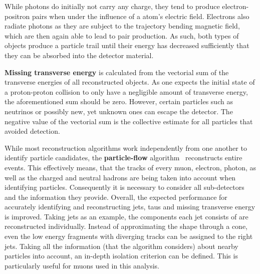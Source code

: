 While photons do initially not carry any charge, they tend to produce electron-positron pairs when under the influence of a atom's electric field. Electrons also radiate photons as they are subject to the trajectory bending magnetic field, which are then again able to lead to pair production. As such, both types of objects produce a particle trail until their energy has decreased sufficiently that they can be absorbed into the detector material.

\textbf{Missing transverse energy} is calculated from the vectorial sum of the transverse energies of all reconstructed objects. As one expects the initial state of a proton-proton collision to only have a negligible amount of transverse energy, the aforementioned sum should be zero. However, certain particles such as neutrinos or possibly new, yet unknown ones can escape the detector. The negative value of the vectorial sum is the collective estimate for all particles that avoided detection.

While most reconstruction algorithms work independently from one another to identify particle candidates, the \textbf{particle-flow} algorithm~\cite{pflow} reconstructs entire events. This effectively means, that the tracks of every muon, electron, photon, as well as the charged and neutral hadrons are being taken into account when identifying particles. Consequently it is necessary to consider all sub-detectors and the information they provide. Overall, the expected performance for accurately identifying and reconstructing jets, taus and missing transverse energy is improved. Taking jets as an example, the components each jet consists of are reconstructed individually. Instead of approximating the shape through a cone, even the low energy fragments with diverging tracks can be assigned to the right jets. Taking all the information (that the algorithm considers) about nearby particles into account, an in-depth isolation criterion can be defined. This is particularly useful for muons used in this analysis.



